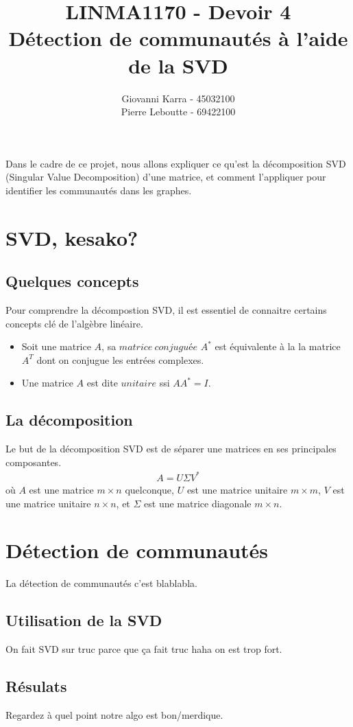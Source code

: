 \documentclass[11pt]{article}
\title{LINMA1170 - Devoir 4\\Détection de communautés à l'aide de la SVD}
\author{Giovanni Karra - 45032100\\Pierre Leboutte - 69422100}
\begin{document}
\maketitle

Dans le cadre de ce projet, nous allons expliquer ce qu'est la décomposition SVD (Singular Value Decomposition) d'une matrice, et comment l'appliquer pour identifier les communautés dans les graphes.

\section*{SVD, kesako?}

\subsection*{Quelques concepts}
Pour comprendre la décompostion SVD, il est essentiel de connaitre certains concepts clé de l'algèbre linéaire.\\
\begin{itemize}
    \item Soit une matrice $A$, sa $matrice ~conjugu$é$e$ $A^*$ est équivalente à la la matrice $A^T$ dont on conjugue les entrées complexes. 
    \item Une matrice $A$ est dite $unitaire$ ssi $AA^* = I$.
\end{itemize}

\subsection*{La décomposition}
Le but de la décomposition SVD est de séparer une matrices en ses principales composantes.
\begin{align*}
    A = U \Sigma V^*
\end{align*}
où $A$ est une matrice $m\times n$ quelconque, $U$ est une matrice unitaire $m\times m$, $V$ est une matrice unitaire $n \times n$, et $\Sigma$ est une matrice diagonale $m \times n$.

\section*{Détection de communautés}
La détection de communautés c'est blablabla.

\subsection*{Utilisation de la SVD}
On fait SVD sur truc parce que ça fait truc haha on est trop fort.

\subsection*{Résulats}
Regardez à quel point notre algo est bon/merdique.
\end{document}
